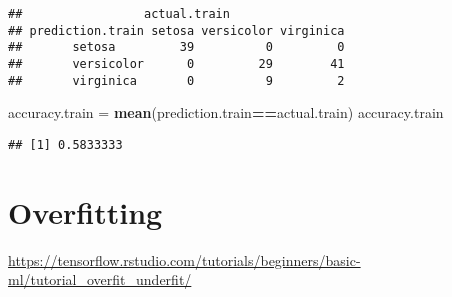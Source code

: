 \documentclass[
]{book}
\newenvironment{Shaded}{\begin{snugshade}}{\end{snugshade}}
\newcommand{\KeywordTok}[1]{\textcolor[rgb]{0.13,0.29,0.53}{\textbf{#1}}}
\newcommand{\NormalTok}[1]{#1}
\newcommand{\OperatorTok}[1]{\textcolor[rgb]{0.81,0.36,0.00}{\textbf{#1}}}
\newcommand{\StringTok}[1]{\textcolor[rgb]{0.31,0.60,0.02}{#1}}
\begin{document}
\begin{verbatim}
##                 actual.train
## prediction.train setosa versicolor virginica
##       setosa         39          0         0
##       versicolor      0         29        41
##       virginica       0          9         2
\end{verbatim}

\begin{Shaded}
\begin{Highlighting}[]
\NormalTok{accuracy.train =}\StringTok{ }\KeywordTok{mean}\NormalTok{(prediction.train}\OperatorTok{==}\NormalTok{actual.train)}
\NormalTok{accuracy.train}
\end{Highlighting}
\end{Shaded}

\begin{verbatim}
## [1] 0.5833333
\end{verbatim}

\hypertarget{overfitting}{%
\section{Overfitting}\label{overfitting}}

\url{https://tensorflow.rstudio.com/tutorials/beginners/basic-ml/tutorial_overfit_underfit/}

  
\end{document}

